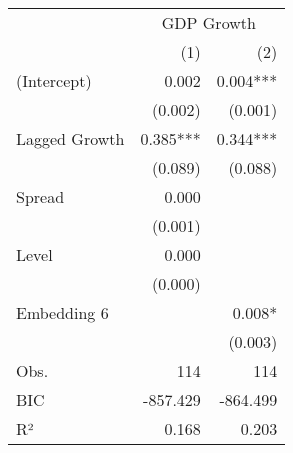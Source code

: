 \begin{tabular}{lrr}
\toprule
              &  \multicolumn{2}{c}{GDP Growth} \\ 
\cmidrule(lr){2-3} 
              &            (1) &            (2) \\ 
\midrule
(Intercept)   &          0.002 &       0.004*** \\ 
              &        (0.002) &        (0.001) \\ 
Lagged Growth &       0.385*** &       0.344*** \\ 
              &        (0.089) &        (0.088) \\ 
Spread        &          0.000 &                \\ 
              &        (0.001) &                \\ 
Level         &          0.000 &                \\ 
              &        (0.000) &                \\ 
Embedding 6   &                &         0.008* \\ 
              &                &        (0.003) \\ 
\midrule
Obs.          &            114 &            114 \\ 
BIC           &       -857.429 &       -864.499 \\ 
R²            &          0.168 &          0.203 \\ 
\bottomrule
\end{tabular}

